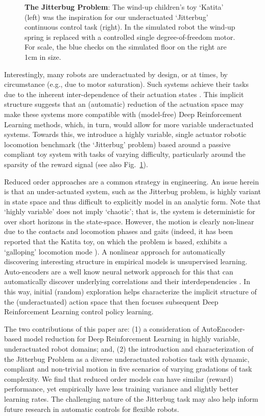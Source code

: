 \documentclass[letterpaper, 10 pt, conference]{ieeeconf}
\begin{document}
\begin{figure}[t]
    \setlength{\belowcaptionskip}{-10pt}
    \caption{
        \textbf{The Jitterbug Problem}: The wind-up children's toy `Katita' (left) was the inspiration for our underactuated `Jitterbug' continuous control task (right).
        In the simulated robot the wind-up spring is replaced with a controlled single degree-of-freedom motor.
        For scale, the blue checks on the simulated floor on the right are 1cm in size.
    }
    \label{fig:leader}
    
\end{figure} 

Interestingly, many robots are underactuated by design, or at times, by circumstance (e.g., due to motor saturation).
Such systems achieve their tasks due to the inherent inter-dependence of their actuation states \cite{spong1998underactuated}.
This implicit structure suggests that an (automatic) reduction of the actuation space may make these systems more compatible with (model-free) Deep Reinforcement Learning methods, which, in turn, would allow for more variable underactuated systems.
Towards this, we introduce a highly variable, single actuator robotic locomotion benchmark (the `Jitterbug' problem) based around a passive compliant toy system with tasks of varying difficulty, particularly around the sparsity of the reward signal (see also Fig.~\ref{fig:leader}).

Reduced order approaches are a common strategy in engineering.
An issue herein is that an under-actuated system, such as the Jitterbug problem, is highly variant in state space and thus difficult to explicitly model in an analytic form.
Note that `highly variable' does not imply `chaotic'; that is, the system is deterministic for over short horizons in the state-space.
However, the motion is clearly non-linear due to the contacts and locomotion phases and gaits (indeed, it has been reported that the Katita toy, on which the problem is based, exhibits a `galloping' locomotion mode \cite{jgn.thesis}).
A nonlinear approach for automatically discovering interesting structure in empirical models is unsupervised learning.
Auto-encoders are a well know neural network approach for this that can automatically discover underlying correlations and their interdependencies \cite{AE_hinton2006reducing}.
In this way, initial (random) exploration helps characterize the implicit structure of the (underactuated) action space that then focuses subsequent Deep Reinforcement Learning control policy learning.

The two contributions of this paper are: (1) a consideration of AutoEncoder-based model reduction for Deep Reinforcement Learning in highly variable, underactuated robot domains; and, (2) the introduction and characterization of the Jitterbug Problem as a diverse underactuated robotics task with dynamic, compliant and non-trivial motion in five scenarios of varying gradations of task complexity.
We find that reduced order models can have similar (reward) performance, yet empirically have less training variance and slightly better learning rates.  
The challenging nature of the Jitterbug task may also help inform future research in automatic controls for flexible robots.
\end{document}
